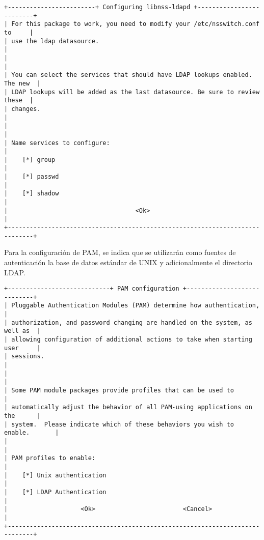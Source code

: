 {
\scriptsize
\linespread{1}
\begin{verbatim}
+------------------------+ Configuring libnss-ldapd +-------------------------+
| For this package to work, you need to modify your /etc/nsswitch.conf to     |
| use the ldap datasource.                                                    |
|                                                                             |
| You can select the services that should have LDAP lookups enabled. The new  |
| LDAP lookups will be added as the last datasource. Be sure to review these  |
| changes.                                                                    |
|                                                                             |
| Name services to configure:                                                 |
|    [*] group                                                                |
|    [*] passwd                                                               |
|    [*] shadow                                                               |
|                                   <Ok>                                      |
+-----------------------------------------------------------------------------+
\end{verbatim}
}

Para la configuraci\'{o}n de \textsc{PAM}, se indica que se utilizar\'{a}n como fuentes de autenticaci\'{o}n la base de datos est\'{a}ndar de UNIX y adicionalmente el directorio LDAP.

{
\scriptsize
\linespread{1}
\begin{verbatim}
+----------------------------+ PAM configuration +----------------------------+
| Pluggable Authentication Modules (PAM) determine how authentication,        |
| authorization, and password changing are handled on the system, as well as  |
| allowing configuration of additional actions to take when starting user     |
| sessions.                                                                   |
|                                                                             |
| Some PAM module packages provide profiles that can be used to               |
| automatically adjust the behavior of all PAM-using applications on the      |
| system.  Please indicate which of these behaviors you wish to enable.       |
|                                                                             |
| PAM profiles to enable:                                                     |
|    [*] Unix authentication                                                  |
|    [*] LDAP Authentication                                                  |
|                    <Ok>                        <Cancel>                     |
+-----------------------------------------------------------------------------+
\end{verbatim}
}

